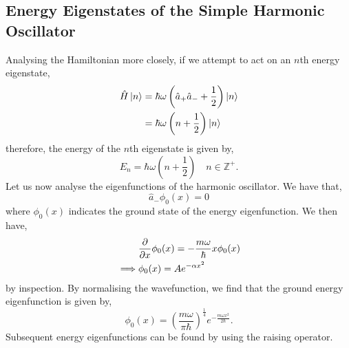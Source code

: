 \documentclass{book}
\begin{document}
\subsection{Energy Eigenstates of the Simple Harmonic Oscillator}
Analysing the Hamiltonian more closely, if we attempt to act on an $n$th energy eigenstate,
\begin{equation}
	\begin{split}
	\hat{H} \ket{n} & = \hbar\omega\left(\hat{a}_+\hat{a}_- + \frac{1}{2}\right)\ket{n} \\
	& = \hbar \omega \left(n + \frac{1}{2}\right)\ket{n}
\end{split} 
\end{equation}
therefore, the energy of the $n$th eigenstate is given by,
\begin{equation}
	E_n =  \hbar\omega\left(n + \frac{1}{2}\right) \hspace{1em} n \in \mathbb{Z}^+.
\end{equation}
Let us now analyse the eigenfunctions of the harmonic oscillator. We have that,
\begin{equation}
	\hat{a}_-\phi_0(x) = 0
\end{equation}
where $\phi_0(x)$ indicates the ground state of the energy eigenfunction. We then have,
\begin{equation}
	\begin{split}
	& \pdv{x} \phi_0(x) = -\frac{m\omega}{\hbar}x\phi_0(x) \\
	\implies & \phi_0(x) = Ae^{-\alpha x^2}
\end{split}
\end{equation}
by inspection. By normalising the wavefunction, we find that the ground energy eigenfunction is given by,
\begin{equation}
	\phi_0(x) = \left(\frac{m\omega}{\pi \hbar}\right)^{\frac{1}{4}} e^{-\frac{m\omega x^2}{2\hbar}}.
\end{equation}
Subsequent energy eigenfunctions can be found by using the raising operator.
\end{document}
